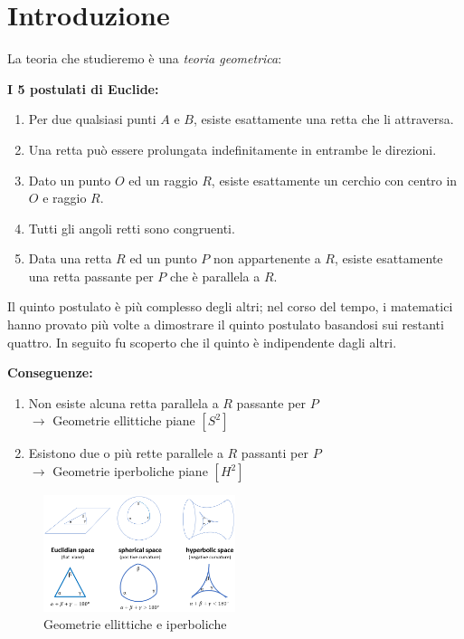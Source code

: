 \chapter{Introduzione}

La teoria che studieremo è una \textit{teoria geometrica}:

\textbf{I 5 postulati di Euclide:}
\begin{enumerate}
    \item Per due qualsiasi punti $A$ e $B$, esiste esattamente una retta che li attraversa.
    \item Una retta può essere prolungata indefinitamente in entrambe le direzioni.
    \item Dato un punto $O$ ed un raggio $R$, esiste esattamente un cerchio con centro in $O$ e raggio $R$.
    \item Tutti gli angoli retti sono congruenti.
    \item Data una retta $R$ ed un punto $P$ non appartenente a $R$, esiste esattamente una retta passante per $P$ che è parallela a $R$.
\end{enumerate}

Il quinto postulato è più complesso degli altri; nel corso del tempo, i matematici hanno provato più volte a dimostrare il quinto postulato basandosi sui restanti quattro. In seguito fu scoperto che il quinto è indipendente dagli altri.

\textbf{Conseguenze:}
\begin{enumerate}
    \item Non esiste alcuna retta parallela a $R$ passante per $P$ \\
    \quad $\rightarrow$ Geometrie ellittiche piane $[S^2]$
    \item Esistono due o più rette parallele a $R$ passanti per $P$ \\
    \quad $\rightarrow$ Geometrie iperboliche piane $[H^2]$
\end{enumerate}

\begin{figure}[H]
    \centering
    \includegraphics[width=0.5\textwidth]{assets/geometries.png}
    \caption{Geometrie ellittiche e iperboliche}
\end{figure}

